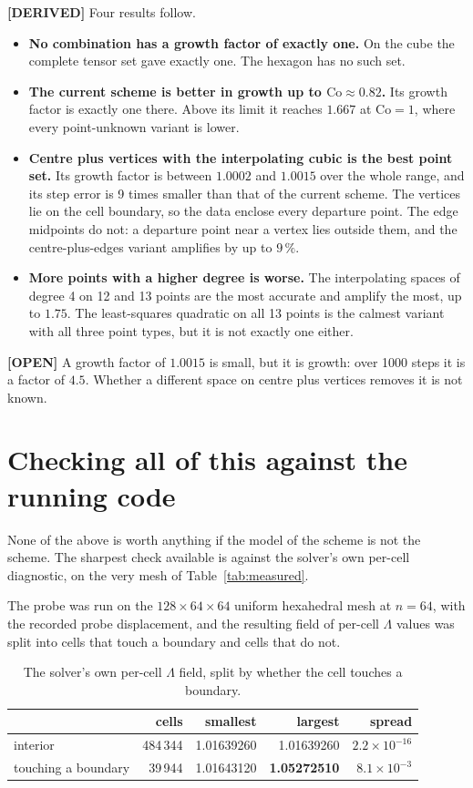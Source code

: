 \documentclass[11pt,a4paper]{article}
\newcommand{\derived}{\textcolor{blue!50!black}{\textbf{[DERIVED]}}}
\newcommand{\opn}{\textcolor{orange!80!black}{\textbf{[OPEN]}}}
\begin{document}
\derived{} Four results follow.
\begin{itemize}
\item \textbf{No combination has a growth factor of exactly one.} On the cube the complete
      tensor set gave exactly one. The hexagon has no such set.
\item \textbf{The current scheme is better in growth up to \(\mathrm{Co} \approx 0.82\).} Its
      growth factor is exactly one there. Above its limit it reaches \(1.667\) at
      \(\mathrm{Co} = 1\), where every point-unknown variant is lower.
\item \textbf{Centre plus vertices with the interpolating cubic is the best point set.} Its
      growth factor is between \(1.0002\) and \(1.0015\) over the whole range, and its step
      error is 9 times smaller than that of the current scheme. The vertices lie on the cell
      boundary, so the data enclose every departure point. The edge midpoints do not: a
      departure point near a vertex lies outside them, and the centre-plus-edges variant
      amplifies by up to \(9\,\%\).
\item \textbf{More points with a higher degree is worse.} The interpolating spaces of degree 4
      on 12 and 13 points are the most accurate and amplify the most, up to \(1.75\). The
      least-squares quadratic on all 13 points is the calmest variant with all three point
      types, but it is not exactly one either.
\end{itemize}

\opn{} A growth factor of \(1.0015\) is small, but it is growth: over 1000 steps it is a factor
of \(4.5\). Whether a different space on centre plus vertices removes it is not known.

\section{Checking all of this against the running code}
\label{sec:symbol-valid}

None of the above is worth anything if the model of the scheme is not the scheme. The sharpest
check available is against the solver's own per-cell diagnostic, on the very mesh of
Table~\ref{tab:measured}.

The probe was run on the $128\times 64\times 64$ uniform hexahedral mesh at $n = 64$, with the
recorded probe displacement, and the resulting field of per-cell $\Lambda$ values was split
into cells that touch a boundary and cells that do not.

\begin{table}[h]
\centering
\caption{The solver's own per-cell $\Lambda$ field, split by whether the cell touches a boundary.}
\label{tab:split}
\begin{tabular}{lrrrr}
\toprule
 & cells & smallest & largest & spread \\
\midrule
interior         & 484\,344 & 1.01639260 & 1.01639260 & $2.2\times10^{-16}$ \\
touching a boundary & 39\,944 & 1.01643120 & \textbf{1.05272510} & $8.1\times10^{-3}$ \\
\bottomrule
\end{tabular}
\end{table}
\end{document}
